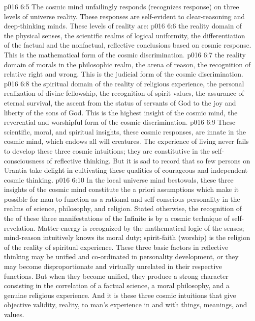 \vs p016 6:5 The cosmic mind unfailingly responds (recognizes response) on three levels of universe reality. These responses are self\hyp{}evident to clear\hyp{}reasoning and deep\hyp{}thinking minds. These levels of reality are:
\pc \vs p016 6:6 \bibnobreakspace {}the reality domain of the physical senses, the scientific realms of logical uniformity, the differentiation of the factual and the nonfactual, reflective conclusions based on cosmic response. This is the mathematical form of the cosmic discrimination.
\pc \vs p016 6:7 \bibnobreakspace {}the reality domain of morals in the philosophic realm, the arena of reason, the recognition of relative right and wrong. This is the judicial form of the cosmic discrimination.
\pc \vs p016 6:8 \bibnobreakspace {}the spiritual domain of the reality of religious experience, the personal realization of divine fellowship, the recognition of spirit values, the assurance of eternal survival, the ascent from the status of servants of God to the joy and liberty of the sons of God. This is the highest insight of the cosmic mind, the reverential and worshipful form of the cosmic discrimination.
\pc \vs p016 6:9 These scientific, moral, and spiritual insights, these cosmic responses, are innate in the cosmic mind, which endows all will creatures. The experience of living never fails to develop these three cosmic intuitions; they are constitutive in the self\hyp{}consciousness of reflective thinking. But it is sad to record that so few persons on Urantia take delight in cultivating these qualities of courageous and independent cosmic thinking.
\pc \vs p016 6:10 In the local universe mind bestowals, these three insights of the cosmic mind constitute the a priori assumptions which make it possible for man to function as a rational and self\hyp{}conscious personality in the realms of science, philosophy, and religion. Stated otherwise, the recognition of the  of these three manifestations of the Infinite is by a cosmic technique of self\hyp{}revelation. Matter\hyp{}energy is recognized by the mathematical logic of the senses; mind\hyp{}reason intuitively knows its moral duty; spirit\hyp{}faith (worship) is the religion of the reality of spiritual experience. These three basic factors in reflective thinking may be unified and co\hyp{}ordinated in personality development, or they may become disproportionate and virtually unrelated in their respective functions. But when they become unified, they produce a strong character consisting in the correlation of a factual science, a moral philosophy, and a genuine religious experience. And it is these three cosmic intuitions that give objective validity, reality, to man’s experience in and with things, meanings, and values.
